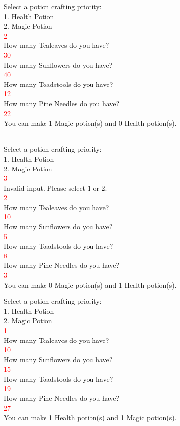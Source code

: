 \begin{sample}
Select a potion crafting priority:
\\1. Health Potion
\\2. Magic Potion
\\\textcolor{red}{2}
\\How many Tealeaves do you have?
\\\textcolor{red}{30}
\\How many Sunflowers do you have?
\\\textcolor{red}{40}
\\How many Toadstools do you have?
\\\textcolor{red}{12}
\\How many Pine Needles do you have?
\\\textcolor{red}{22}
\\You can make 1 Magic potion(s) and 0 Health potion(s).
\end{sample}


\begin{sample}
\\Select a potion crafting priority:
\\1. Health Potion
\\2. Magic Potion
\\\textcolor{red}{3}
\\Invalid input. Please select 1 or 2.
\\\textcolor{red}{2}
\\How many Tealeaves do you have?
\\\textcolor{red}{10}
\\How many Sunflowers do you have?
\\\textcolor{red}{5}
\\How many Toadstools do you have?
\\\textcolor{red}{8}
\\How many Pine Needles do you have?
\\\textcolor{red}{3}
\\You can make 0 Magic potion(s) and 1 Health potion(s).
\end{sample}

\begin{sample}
Select a potion crafting priority:
\\1. Health Potion
\\2. Magic Potion
\\\textcolor{red}{1}
\\How many Tealeaves do you have?
\\\textcolor{red}{10}
\\How many Sunflowers do you have?
\\\textcolor{red}{15}
\\How many Toadstools do you have?
\\\textcolor{red}{19}
\\How many Pine Needles do you have?
\\\textcolor{red}{27}
\\You can make 1 Health potion(s) and 1 Magic potion(s).
\end{sample}

